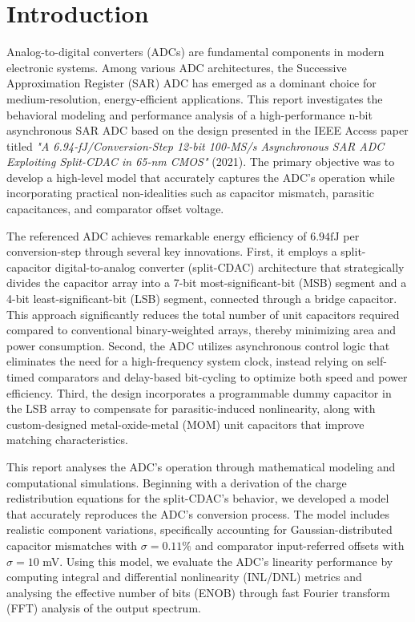 \section{Introduction}

Analog-to-digital converters (ADCs) are fundamental components in modern electronic systems. Among various ADC architectures, the Successive Approximation Register (SAR) ADC has emerged as a dominant choice for medium-resolution, energy-efficient applications. This report investigates the behavioral modeling and performance analysis of a high-performance n-bit asynchronous SAR ADC based on the design presented in the IEEE Access paper titled \textit{"A 6.94-fJ/Conversion-Step 12-bit 100-MS/s Asynchronous SAR ADC Exploiting Split-CDAC in 65-nm CMOS"} (2021)\textsuperscript{\cite{paper}}. The primary objective was to develop a high-level model that accurately captures the ADC's operation while incorporating practical non-idealities such as capacitor mismatch, parasitic capacitances, and comparator offset voltage.

The referenced ADC achieves remarkable energy efficiency of $6.94 \si{\femto \joule}$ per conversion-step through several key innovations. First, it employs a split-capacitor digital-to-analog converter (split-CDAC) architecture that strategically divides the capacitor array into a 7-bit most-significant-bit (MSB) segment and a 4-bit least-significant-bit (LSB) segment, connected through a bridge capacitor. This approach significantly reduces the total number of unit capacitors required compared to conventional binary-weighted arrays, thereby minimizing area and power consumption. Second, the ADC utilizes asynchronous control logic that eliminates the need for a high-frequency system clock, instead relying on self-timed comparators and delay-based bit-cycling to optimize both speed and power efficiency. Third, the design incorporates a programmable dummy capacitor in the LSB array to compensate for parasitic-induced nonlinearity, along with custom-designed metal-oxide-metal (MOM) unit capacitors that improve matching characteristics.

This report analyses the ADC's operation through mathematical modeling and computational simulations. Beginning with a derivation of the charge redistribution equations for the split-CDAC's behavior, we developed a model that accurately reproduces the ADC's conversion process. The model includes realistic component variations, specifically accounting for Gaussian-distributed capacitor mismatches with $\sigma = 0.11\%$ and comparator input-referred offsets with $\sigma = 10$ mV. Using this model, we evaluate the ADC's linearity performance by computing integral and differential nonlinearity (INL/DNL) metrics and analysing the effective number of bits (ENOB) through fast Fourier transform (FFT) analysis of the output spectrum.

